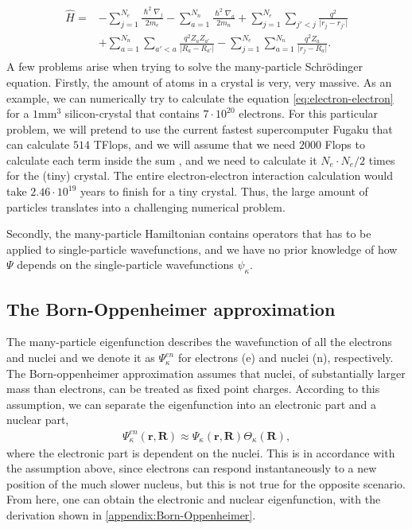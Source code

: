 \begin{align}
  \begin{aligned}
    \hat{H} = &- \sum_{j=1}^{N_e} \frac{\hslash^2\nabla_j}{2m_e} - \sum_{a=1}^{N_n} \frac{\hslash^2\nabla_a}{2m_n} + \sum_{j=1}^{N_e}\sum_{j'<j} \frac{q^2}{\lvert r_j - r_{j'}\rvert} \\ &+\sum_{a=1}^{N_n}\sum_{a'<a} \frac{q^2 Z_aZ_{a'}}{\lvert R_a - R_{a'}\rvert } - \sum_{j=1}^{N_e} \sum_{a=1}^{N_n} \frac{q^2Z_a}{\lvert r_j-R_a\rvert}.
  \end{aligned}
\end{align} A few problems arise when trying to solve the many-particle Schrödinger equation. Firstly, the amount of atoms in a crystal is very, very massive. As an example, we can numerically try to calculate the equation \autoref{eq:electron-electron} for a $1$mm$^3$ silicon-crystal that contains $7\cdot 10^{20}$ electrons. For this particular problem, we will pretend to use the current fastest supercomputer Fugaku \cite{Top500} that can calculate $514$ TFlops, and we will assume that we need $2000$ Flops to calculate each term inside the sum \cite{Persson2020}, and we need to calculate it $N_e \cdot N_e/2$ times for the (tiny) crystal. The entire electron-electron interaction calculation would take $2.46 \cdot 10^{19}$ years to finish for a tiny crystal. Thus, the large amount of particles translates into a challenging numerical problem.


Secondly, the many-particle Hamiltonian contains operators that has to be applied to single-particle wavefunctions, and we have no prior knowledge of how $\Psi$ depends on the single-particle wavefunctions $\psi_\kappa$.


\subsection{The Born-Oppenheimer approximation}
The many-particle eigenfunction describes the wavefunction of all the electrons and nuclei and we denote it as $\Psi_{\kappa}^{en}$ for electrons (e) and nuclei (n), respectively. The Born-oppenheimer approximation assumes that nuclei, of substantially larger mass than electrons, can be treated as fixed point charges. According to this assumption, we can separate the eigenfunction into an electronic part and a nuclear part,
\begin{align}
  \Psi_\kappa^{en}(\boldsymbol{r}, \boldsymbol{R}) \approx \Psi_{\kappa}(\boldsymbol{r}, \boldsymbol{R})\Theta_{\kappa}(\boldsymbol{R}),
\end{align}
where the electronic part is dependent on the nuclei. This is in accordance with the assumption above, since electrons can respond instantaneously to a new position of the much slower nucleus, but this is not true for the opposite scenario. From here, one can obtain the electronic and nuclear eigenfunction, with the derivation shown in \autoref{appendix:Born-Oppenheimer}.


